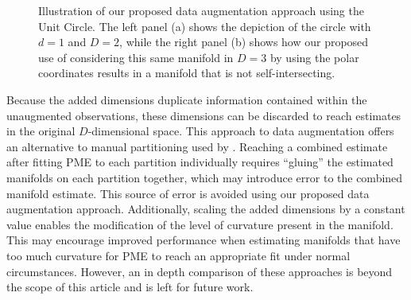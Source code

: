 \documentclass[12pt]{article}
\theoremstyle{definition}
\begin{document}
\begin{figure}
  \centering
  \hfill
  \caption{{\footnotesize Illustration of our proposed data augmentation approach using the Unit Circle. The left panel (a) shows the depiction of the circle with $d=1$ and $D=2$, while the right panel (b) shows how our proposed use of considering this same manifold in $D=3$ by using the polar coordinates results in a manifold that is not self-intersecting.}}
  \label{fig:unit_circle_augmentation}
\end{figure}

Because the added dimensions duplicate information contained within the unaugmented observations, these dimensions can be discarded to reach estimates in the original $D$-dimensional space. This approach to data augmentation offers an alternative to manual partitioning used by \cite{meng2021Principal}. Reaching a combined estimate after fitting PME to each partition individually requires ``gluing'' the estimated manifolds on each partition together, which may introduce error to the combined manifold estimate. This source of error is avoided using our proposed data augmentation approach. Additionally, scaling the added dimensions by a constant value enables the modification of the level of curvature present in the manifold. This may encourage improved performance when estimating manifolds that have too much curvature for PME to reach an appropriate fit under normal circumstances. However, an in depth comparison of these approaches is beyond the scope of this article and is left for future work.
\end{document}
